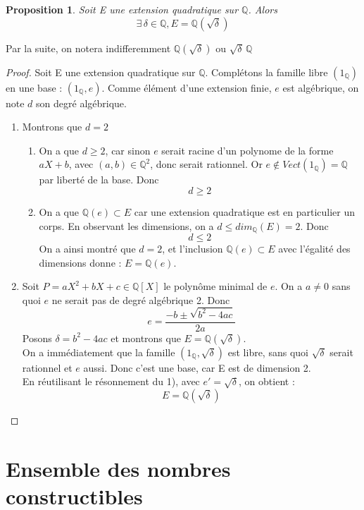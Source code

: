 \documentclass[a4paper,12pt,french]{report}
\newtheorem{proposition}{Proposition}[section]
\begin{document}
		\begin{proposition}
			Soit E une extension quadratique sur $\mathbb{Q}$. Alors
			\[{}
				\exists\, \delta \in \mathbb{Q}, E = \mathbb{Q}(\sqrt{\delta})
			\]
		\end{proposition}
		 Par la suite, on notera indifferemment $\mathbb{Q}(\sqrt{\delta})$ ou $\sqrt{\delta}\,\mathbb{Q}$
		\begin{proof}
			Soit E une extension quadratique sur $\mathbb{Q}$. Complétons la famille libre $(1_{\mathbb{Q}})$ en une base : $(1_{\mathbb{Q}},e)$. Comme élément d'une extension finie, $e$ est algébrique, on note $d$ son degré algébrique.
			\begin{enumerate}
				\item  Montrons que $d = 2$
				\begin{enumerate}
				    \item On a que $d\geq2$, car sinon $e$ serait racine d'un polynome de la forme $aX +b$, avec $(a,b) \in \mathbb{Q}^{2}$, donc serait rationnel. Or  $e \notin Vect(1_{\mathbb{Q}}) = \mathbb{Q}$ par liberté de la base. Donc \[d\geq 2\]
				    \item On a que $\mathbb{Q}(e) \subset E $ car une extension quadratique est en particulier un corps. En observant les dimensions, on a $d \leq dim_{\mathbb{Q}}(E) = 2$. Donc 
				    \[d \leq 2\] On a ainsi montré que $d=2$, et l'inclusion $\mathbb{Q}(e) \subset E $ avec l'égalité des dimensions donne : $E = \mathbb{Q}(e)$.
				\end{enumerate}
				
				\item  Soit $P = aX^{2} + bX +c \in \mathbb{Q}[X]$ le polynôme minimal de $e$. On a $a\neq 0$ sans quoi $e$ ne serait pas de degré algébrique 2. Donc \[e = \frac{-b \pm \sqrt{b^{2} - 4ac}}{2a}\]
				Posons $\delta = b^{2} - 4ac$ et montrons que $E = \mathbb{Q}(\sqrt{\delta})$.\\
				On a immédiatement que la famille \((1_{\mathbb{Q}},\sqrt{\delta})\) est libre, sans quoi $\sqrt{\delta}$ serait rationnel et $e$ aussi. Donc c'est une base, car E est de dimension 2.\\
				En réutilisant le résonnement du 1), avec $e' = \sqrt{\delta}$, on obtient : \[E = \mathbb{Q}(\sqrt{\delta})\]
			\end{enumerate}
		\end{proof}


		\section{Ensemble des nombres constructibles}
		
\end{document}
